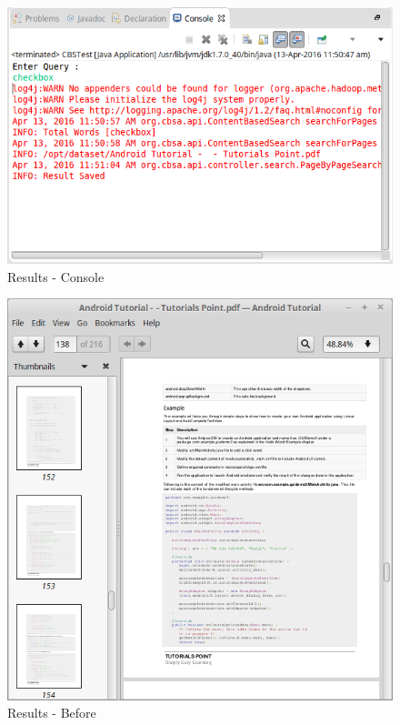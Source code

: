 \documentclass[oneside,a4paper,12pt]{report}
\begin{document}
{\begin{figure}[H]
\includegraphics{results-console}
\caption{Results - Console}
\end{figure}

\begin{figure}[H]
\includegraphics{results-before}
\caption{Results - Before}
\end{figure}

}
\end{document}

